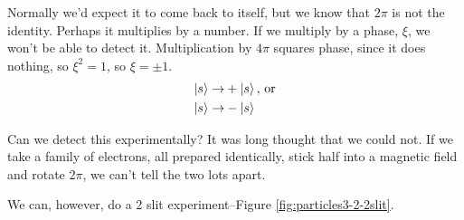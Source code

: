 \documentclass[]{article}
\begin{document}
Normally we'd expect it to come back to itself, but we know that $2\pi$ is not the identity. Perhaps it multiplies by a number. If we multiply by a phase, $\xi$, we won't be able to detect it. Multiplication by $4\pi$ squares phase, since it does nothing, so $\xi^2=1$, so $\xi=\pm1$.
\begin{align*}
	\ket{s} \rightarrow& +\ket{s} \text{, or}\\
	\ket{s} \rightarrow& -\ket{s}
\end{align*}

Can we detect this experimentally? It was long thought that we could not. If we take a family of electrons, all prepared identically, stick half into a magnetic field and rotate $2\pi$, we can't tell the two lots apart.

We can, however, do a 2 slit experiment\cite{aharonov1967observability}--Figure \ref{fig:particles3-2-2slit}.
\end{document}
